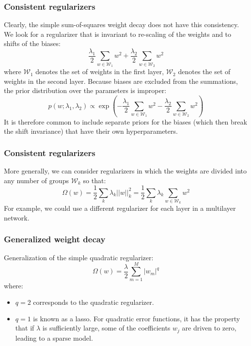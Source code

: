 \documentclass{beamer}
\begin{document}
\begin{frame}
    \frametitle{Consistent regularizers}
    Clearly, the simple sum-of-squares weight decay does not have this consistency. We look for a regularizer that is invariant to re-scaling of the weights and to shifts of the biases:
    \begin{equation*}
        \frac{\lambda_{1}}{2}\sum_{w\in\mathcal{W}_{1}}w^{2}+\frac{\lambda_{2}}{2}\sum_{w\in\mathcal{W}_{2}}w^{2}
    \end{equation*}
    where $\mathcal{W}_{1}$ denotes the set of weights in the first layer, $\mathcal{W}_{2}$ denotes the set of weights in the second layer. Because biases are excluded from the summations, the prior distribution over the parameters is improper:
    \begin{equation*}
        p(w;\lambda_{1},\lambda_{2})\propto\exp(-\frac{\lambda_{1}}{2}\sum_{w\in\mathcal{W}_{1}}w^{2}-\frac{\lambda_{2}}{2}\sum_{w\in\mathcal{W}_{2}}w^{2})
    \end{equation*}
    It is therefore common to include separate priors for the biases (which then break the shift invariance) that have their own hyperparameters.
\end{frame}

\begin{frame}
    \frametitle{Consistent regularizers}
    More generally, we can consider regularizers in which the weights are divided into any number of groups $\mathcal{W}_{k}$ so that:
    \begin{equation*}
        \Omega(w)=\frac{1}{2}\sum_{k}\lambda_{k}||w||_{k}^{2}=\frac{1}{2}\sum_{k}\lambda_{k}\sum_{w\in\mathcal{W}_{k}}w^{2}
    \end{equation*}
    For example, we could use a different regularizer for each layer in a multilayer network.
\end{frame}

\begin{frame}
    \frametitle{Generalized weight decay}
    Generalization of the simple quadratic regularizer:
    \begin{equation*}
        \Omega(w)=\frac{\lambda}{2}\sum_{m=1}^{M}|w_{m}|^{q}
    \end{equation*}
    where:
    \begin{itemize}
        \item $q=2$ corresponds to the quadratic regularizer.
        \item $q=1$ is known as a lasso. For quadratic error functions, it has the property that if $\lambda$ is sufficiently large, some of the coefficients $w_{j}$ are driven to zero, leading to a sparse model.
    \end{itemize}
\end{frame}
\end{document}
